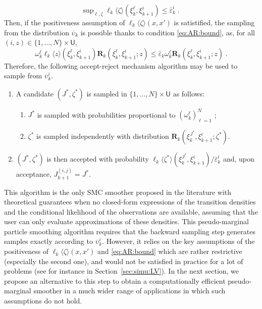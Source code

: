 \documentclass{article}
\newcommand{\N}{N}
\newcommand{\hkup}{\bar{\varepsilon}}
\newcommand{\bi}[3]{J_{#1}^{(#2, #3)}}
\newcommand{\eqsp}{\;}
\newcommand{\ewght}[2]{\ensuremath{\omega_{#1}^{#2}}}
\newcommand{\epart}[2]{\ensuremath{\xi_{#1}^{#2}}}
\newcommand{\marginalset}{\mathsf{U}}
\newcommand{\kernelmarg}{\mathbf{R}}
\newcommand{\qg}[1]{\ell_{#1}}
\newcommand{\hatqg}[1]{\mathsf{\ell}_{#1}}
\begin{document}
\begin{equation}
\mathrm{sup}_{\ell,\zeta}\;\hatqg{k}\langle \zeta\rangle(\epart{k}{\ell},\epart{k+1}{i})\leqslant \hkup^i_k\eqsp. \label{eq:AR:bound}
\end{equation}
Then,  if the positiveness assumption of  $\hatqg{k}\langle \zeta\rangle(x, x')$ is satistified, the sampling from the distribution $\overline\upsilon_k$ is possible thanks to condition \eqref{eq:AR:bound}, as, for all $(i, z) \in \lbrace 1,\dots,N\rbrace\times\marginalset$, 
$$
\ewght{k}{\ell}\hatqg{k}\langle z \rangle(\epart{k}{\ell},\epart{k+1}{i})\kernelmarg_{k}(\epart{k}{\ell},\epart{k+1}{i};z) \leqslant \hkup_k \ewght
{k}{\ell} \kernelmarg_{k}(\epart{k}{\ell},\epart{k+1}{i};z)\eqsp. 
$$
Therefore, the following  accept-reject mechanism algorithm may be used to sample from $\overline \upsilon_k^i$.
\begin{enumerate}
\item A candidate $(J^\ast,\zeta^\ast)$ is sampled in $\{1,\ldots, \N\}\times\marginalset$ as follows: 
\begin{enumerate}
\item $J^\ast$ is sampled with probabilities proportional to  $(\ewght{k}{\ell})_{\ell=1}^{\N}$ ;
\item $\zeta^\ast$ is sampled independently with distribution $\kernelmarg_{k}(\epart{k}{J^\ast},\epart{k+1}{i};\zeta^\ast)$.
\end{enumerate}
\item  $(J^\ast,\zeta^\ast)$ is then accepted with probability $\hatqg{k}\langle \zeta^\ast\rangle(\epart{k}{J^\ast}, \epart{k+1}{i})/\hkup_k^i$ and, upon acceptance, $\bi{k+1}{i}{j} = J^*$.
\end{enumerate}
This algorithm is the only SMC smoother proposed in the literature with  theoretical guarantees when no closed-form expressions of  the  transition  densities and the conditional likelihood of the observations are available,  assuming that the user  can only evaluate  approximations of these densities. 
This pseudo-marginal particle smoothing algorithm  requires that the backward sampling step  generates samples exactly according to $\overline \upsilon_k^i$.  
However, it relies on the key assumptions of the positiveness of $\hatqg{k}\langle \zeta\rangle(x, x')$ and \eqref{eq:AR:bound} which are rather restrictive (especially the second one), and would not be satisfied in practice for a lot of problems (see for instance in Section~\ref{sec:simu:LV}).
 In the next section, we propose an alternative to this step to obtain a computationally efficient pseudo-marginal smoother in a much wider range of applications in which such assumptions do not hold.
\end{document}
